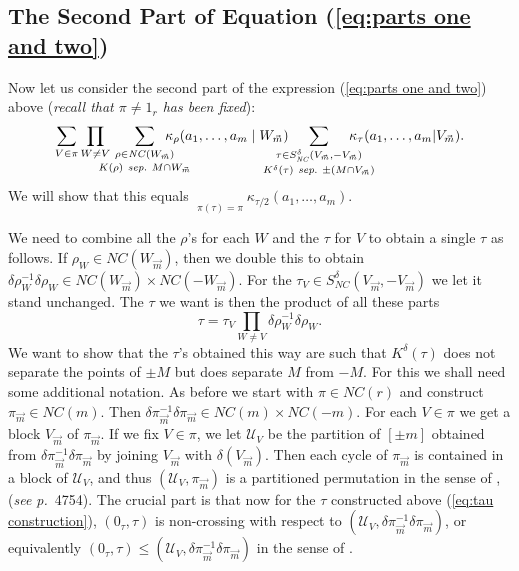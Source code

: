\documentclass[11pt]{amsart}
\theoremstyle{definition}
\numberwithin{theorem}{section}
\newcommand{\cU}{\mathcal{U}}
\newcommand{\sV}{{\scriptscriptstyle V}}
\newcommand{\sW}{{\scriptscriptstyle W}}
\newcommand{\NC}{\mathit{NC}}
\newcommand{\vm}{{\vec{m}}}
\newcommand{\sep}{\mathit{\ sep.\ }}
\newcommand*{\vv}[1]{\vec{\mkern0mu#1}}
\begin{document}
\subsection{\normalsize The Second Part of Equation (\ref{eq:parts one and two})}

Now let us consider the second part of the expression
(\ref{eq:parts one and two}) above (\textit{recall that $\pi
  \not = 1_r$ has been fixed}):
\begin{equation}\label{eq:second term}
\sum_{V \in \pi}
\prod_{W \not=V} \kern-1.0em
\mathop{\sum_{\rho \in \NC(W_{\vv m})}}_{K(\rho) \sep M \cap W_{\vv m}}
\kern-2em
\kappa_\rho(a_1, \dots, a_m \mid W_{\vv m}) \kern-2em
\mathop{\sum_{\tau \in S_\NC^\delta(V_{\vv m}, -V_{\vv m})}}
_{K^\delta(\tau) \sep \pm(M \cap V_\vm)} 
\kern-2em
\kappa_{\tau}(a_1, \dots, a_m | V_{\vv m}). 
\end{equation}
We will show that this equals $\mathop{\sum\limits_{\tau \in S_2}}\limits
_{\pi(\tau) = \pi} \kappa_{\tau/2}(a_1, \dots, a_m)$. 

We need to combine all the $\rho$'s for each $W$ and the
$\tau$ for $V$ to obtain a single $\tau$ as follows. If
$\rho_\sW \in \NC(W_\vm)$, then we double this to obtain
$\delta\rho_\sW^{-1}\delta \rho_\sW \in \NC(W_\vm) \times
\NC(-W_\vm)$. For the $\tau_\sV \in S_\NC^\delta(V_\vm,
-V_\vm)$ we let it stand unchanged. The $\tau$ we want is
then the product of all these parts
\begin{equation}\label{eq:tau construction}
\tau = \tau_\sV \prod_{W \not= V} \delta \rho_\sW^{-1} \delta \rho_\sW.
\end{equation}
We want to show that the $\tau$'s obtained this way are such
that $K^\delta(\tau)$ does not separate the points of $\pm
M$ but does separate $M$ from $-M$. For this we shall need
some additional notation. As before we start with $\pi \in
\NC(r)$ and construct $\pi_\vm \in \NC(m)$. Then $\delta
\pi_\vm^{-1} \delta \pi_\vm \in \NC(m) \times \NC(-m)$. For
each $V \in \pi$ we get a block $V_\vm$ of $\pi_\vm$. If we
fix $V \in \pi$, we let $\cU_\sV$ be the partition of $[ \pm
  m]$ obtained from $\delta \pi_\vm^{-1} \delta \pi_\vm$ by
joining $V_\vm$ with $\delta(V_\vm)$.  Then each cycle of
$\pi_\vm$ is contained in a block of $\cU_\sV$, and thus
$(\cU_\sV, \pi_\vm)$ is a partitioned permutation in the
sense of \cite[\S1]{mst}, (\textit{see p.}~4754). The
crucial part is that now for the $\tau$ constructed above
(\ref{eq:tau construction}), $(0_\tau, \tau)$ is
non-crossing with respect to $(\cU_\sV, \delta\pi_\vm^{-1}
\delta \pi_\vm)$, or equivalently $(0_\tau, \tau) \leq
(\cU_\sV, \delta\pi_\vm^{-1} \delta \pi_\vm)$ in the sense
of \cite[Cor. 38 $(iii)$]{mst}.
\end{document}
